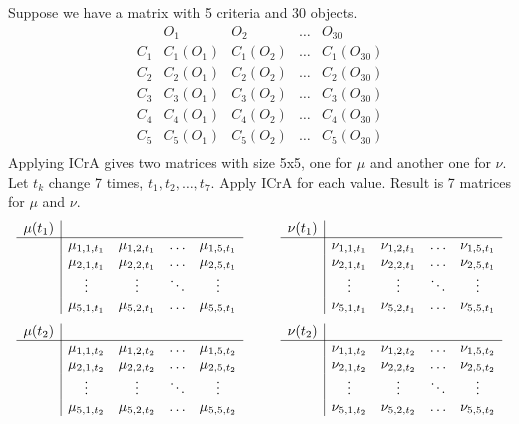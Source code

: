 \documentclass[12pt, a4paper]{article}
\begin{document}
Suppose we have a matrix with 5 criteria and 30 objects.
\[ \begin{array}{c|cccc}
& O_1 & O_2 & \ldots & O_{30} \\
\hline
C_1 & C_1(O_1) & C_1(O_2) & \ldots & C_1(O_{30}) \\
C_2 & C_2(O_1) & C_2(O_2) & \ldots & C_2(O_{30}) \\
C_3 & C_3(O_1) & C_3(O_2) & \ldots & C_3(O_{30}) \\
C_4 & C_4(O_1) & C_4(O_2) & \ldots & C_4(O_{30}) \\
C_5 & C_5(O_1) & C_5(O_2) & \ldots & C_5(O_{30}) \\
\end{array} \]
Applying ICrA gives two matrices with size 5x5, one for $\mu$ and another one for $\nu$.
Let $t_k$ change 7 times, $t_1, t_2, \ldots, t_7$. Apply ICrA for each value.
Result is 7 matrices for $\mu$ and $\nu$.
\[ \begin{array}{c|cccc cc c|cccc}
\mu(t_1) & & & & & & & \nu(t_1) & & & & \\
\cline{1-5} \cline{8-12}
& \mu_{1,1,t_1} & \mu_{1,2,t_1} & \ldots & \mu_{1,5,t_1} & \mbox{ } & \mbox{ } & & \nu_{1,1,t_1} & \nu_{1,2,t_1} & \ldots & \nu_{1,5,t_1} \\
& \mu_{2,1,t_1} & \mu_{2,2,t_1} & \ldots & \mu_{2,5,t_1} & \mbox{ } & \mbox{ } & & \nu_{2,1,t_1} & \nu_{2,2,t_1} & \ldots & \nu_{2,5,t_1} \\
& \vdots & \vdots & \ddots & \vdots & \mbox{ } & \mbox{ } & & \vdots & \vdots & \ddots & \vdots \\
& \mu_{5,1,t_1} & \mu_{5,2,t_1} & \ldots & \mu_{5,5,t_1} & \mbox{ } & \mbox{ } & & \nu_{5,1,t_1} & \nu_{5,2,t_1} & \ldots & \nu_{5,5,t_1}
\end{array} \]
\[ \begin{array}{c|cccc cc c|cccc}
\mu(t_2) & & & & & & & \nu(t_2) & & & & \\
\cline{1-5} \cline{8-12}
& \mu_{1,1,t_2} & \mu_{1,2,t_2} & \ldots & \mu_{1,5,t_2} & \mbox{ } & \mbox{ } & & \nu_{1,1,t_2} & \nu_{1,2,t_2} & \ldots & \nu_{1,5,t_2} \\
& \mu_{2,1,t_2} & \mu_{2,2,t_2} & \ldots & \mu_{2,5,t_2} & \mbox{ } & \mbox{ } & & \nu_{2,1,t_2} & \nu_{2,2,t_2} & \ldots & \nu_{2,5,t_2} \\
& \vdots & \vdots & \ddots & \vdots & \mbox{ } & \mbox{ } & & \vdots & \vdots & \ddots & \vdots \\
& \mu_{5,1,t_2} & \mu_{5,2,t_2} & \ldots & \mu_{5,5,t_2} & \mbox{ } & \mbox{ } & & \nu_{5,1,t_2} & \nu_{5,2,t_2} & \ldots & \nu_{5,5,t_2}
\end{array} \]
\end{document}
